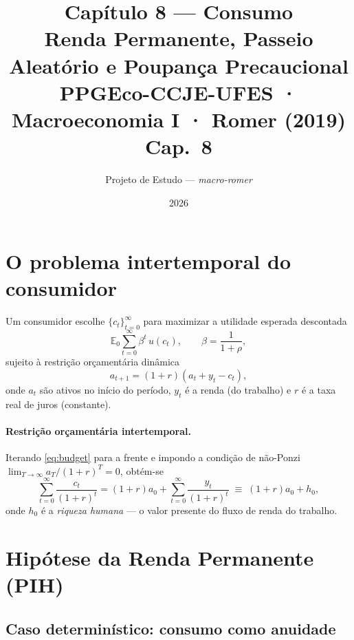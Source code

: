 \documentclass[11pt,a4paper]{article}
\title{\textbf{Capítulo 8 --- Consumo}\\[4pt]
       {\large Renda Permanente, Passeio Aleatório e Poupança Precaucional}\\[2pt]
       {\normalsize PPGEco-CCJE-UFES · Macroeconomia I · Romer (2019) Cap.\ 8}}
\author{Projeto de Estudo --- \textit{macro-romer}}
\date{2026}
\newcommand{\E}{\mathbb{E}}
\begin{document}
\maketitle
\tableofcontents
\bigskip

\section{O problema intertemporal do consumidor}

Um consumidor escolhe $\{c_t\}_{t=0}^{\infty}$ para maximizar a utilidade
esperada descontada
\begin{equation}\label{eq:objective}
  \E_0 \sum_{t=0}^{\infty} \beta^t\, u(c_t), \qquad \beta = \frac{1}{1+\rho},
\end{equation}
sujeito à restrição orçamentária dinâmica
\begin{equation}\label{eq:budget}
  a_{t+1} = (1+r)(a_t + y_t - c_t),
\end{equation}
onde $a_t$ são ativos no início do período, $y_t$ é a renda (do trabalho)
e $r$ é a taxa real de juros (constante).

\paragraph{Restrição orçamentária intertemporal.}
Iterando \eqref{eq:budget} para a frente e impondo a condição de
não-Ponzi $\lim_{T\to\infty} a_T/(1+r)^T = 0$, obtém-se
\begin{equation}\label{eq:lifetime_budget}
  \sum_{t=0}^{\infty} \frac{c_t}{(1+r)^t}
  = (1+r)a_0 + \sum_{t=0}^{\infty} \frac{y_t}{(1+r)^t}
  \;\equiv\; (1+r)a_0 + h_0,
\end{equation}
onde $h_0$ é a \emph{riqueza humana} --- o valor presente do fluxo de
renda do trabalho.

\section{Hipótese da Renda Permanente (PIH)}

\subsection{Caso determinístico: consumo como anuidade}
\end{document}
